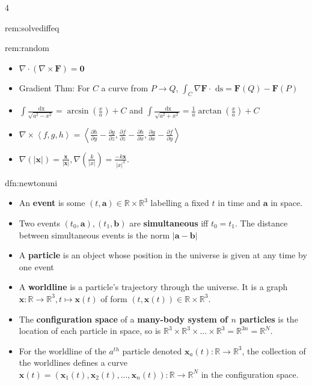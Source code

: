 \documentclass[landscape, 8pt]{extarticle}
\begin{document}
\begin{multicols*}{4}
\begin{rem}{rem:solvediffeq}{ }
		\end{rem}
		
		
		\begin{rem}{rem:random}{ }
			\begin{itemize}
				\item $\nabla \cdot (\nabla \times \bm{F}) = \bm{0}$\\
				\item Gradient Thm: For $C$ a curve from $P \to Q$, $\int_C \nabla \bm{F} \cdot \text{ ds} = \bm{F}(Q) - \bm{F}(P)$
				\item $\int \frac{ \text{ dx}}{\sqrt{a^2 - x^2}} = \arcsin(\frac{x}{a}) + C$ and $\int \frac{ \text{ dx}}{\sqrt{a^2 + x^2}} = \frac{1}{a} \arctan(\frac{x}{a}) + C$
				\item $\nabla \times \left\langle f, g, h\right\rangle = \left\langle \frac{\partial h}{\partial y} - \frac{\partial g}{\partial z}, \frac{\partial f}{\partial z} - \frac{\partial h}{\partial x}, \frac{\partial g}{\partial x} - \frac{\partial f}{\partial y}\right\rangle$
				\item $\nabla(\left|\bm{x}\right|) = \frac{\bm{x}}{\left|\bm{x}\right|}, \nabla \left(\frac{k}{\left|x\right|}\right) = \frac{-k\bm{x}}{\left|x\right|^3}$.
			\end{itemize}
			
		\end{rem}
		
		
		\begin{dfn}{dfn:newtonuni}{ }
			\begin{itemize}
				\item An \textbf{event} is some $(t, \bm{a})\in \mathbb{R} \times \mathbb{R}^3$ labelling a fixed $t$ in time and $\bm{a}$ in space.
				\item Two events $(t_0, \bm{a}), (t_1, \bm{b})$ are \textbf{simultaneous} iff $t_0 = t_1$. The distance between simultaneous events is the norm $\left|\bm{a} - \bm{b}\right|$
				\item A \textbf{particle} is an object whose position in the universe is given at any time by one event
				\item A \textbf{worldline} is a particle's trajectory through the universe. It is a graph $\bm{x} : \mathbb{R} \to \mathbb{R}^3, t \mapsto\bm{x}(t)$ of form $(t, \bm{x}(t))\in \mathbb{R} \times \mathbb{R}^3$.
				\item The \textbf{configuration space} of a \textbf{many-body system of $n$ particles} is the location of each particle in space, so is $\mathbb{R}^3 \times \mathbb{R}^3 \times \dots \times \mathbb{R}^3 = \mathbb{R}^{3n} = \mathbb{R}^N$.
				\item For the worldline of the $a^{th}$ particle denoted $\bm{x}_a(t): \mathbb{R} \to \mathbb{R}^3$, the collection of the worldlines defines a curve $\bm{x}(t) = (\bm{x}_1(t), \bm{x}_2(t), ..., \bm{x}_n(t)): \mathbb{R} \to \mathbb{R}^N$ in the configuration space.
			\end{itemize}
			

\end{dfn}
\end{multicols*}
\end{document}
